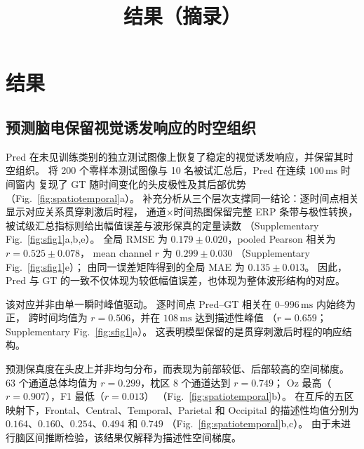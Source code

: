 \documentclass[a4paper,11pt]{article}
\title{结果（摘录）}
\author{}
\date{}
\begin{document}
\maketitle


\setcounter{section}{2}
\section{结果}
\label{sec:results}

\subsection{预测脑电保留视觉诱发响应的时空组织}
\label{sec:spatiotemporal}

Pred 在未见训练类别的独立测试图像上恢复了稳定的视觉诱发响应，并保留其时空组织。
将 200 个零样本测试图像与 10 名被试汇总后，Pred 在连续 $100\,\mathrm{ms}$ 时间窗内
复现了 GT 随时间变化的头皮极性及其后部优势
（Fig.~\ref{fig:spatiotemporal}a）。
补充分析从三个层次支撑同一结论：逐时间点相关显示对应关系贯穿刺激后时程，
通道$\times$时间热图保留完整 ERP 条带与极性转换，
被试级汇总指标则给出幅值误差与波形保真的定量读数
（Supplementary Fig.~\ref{fig:sfig1}a,b,e）。
全局 RMSE 为 $0.179\pm0.020$，pooled Pearson 相关为 $r=0.525\pm0.078$，
mean channel $r$ 为 $0.299\pm0.030$
（Supplementary Fig.~\ref{fig:sfig1}e）；
由同一误差矩阵得到的全局 MAE 为 $0.135\pm0.013$。
因此，Pred 与 GT 的一致不仅体现为较低幅值误差，也体现为整体波形结构的对应。

该对应并非由单一瞬时峰值驱动。
逐时间点 Pred--GT 相关在 $0$--$996\,\mathrm{ms}$ 内始终为正，
跨时间均值为 $r=0.506$，并在 $108\,\mathrm{ms}$ 达到描述性峰值
（$r=0.659$；Supplementary Fig.~\ref{fig:sfig1}a）。
这表明模型保留的是贯穿刺激后时程的响应结构。

预测保真度在头皮上并非均匀分布，而表现为前部较低、后部较高的空间梯度。
63 个通道总体均值为 $r=0.299$，枕区 8 个通道达到 $r=0.749$；
Oz 最高（$r=0.907$），F1 最低（$r=0.013$）
（Fig.~\ref{fig:spatiotemporal}b）。
在互斥的五区映射下，Frontal、Central、Temporal、Parietal 和 Occipital
的描述性均值分别为 $0.164$、$0.160$、$0.254$、$0.494$ 和 $0.749$
（Fig.~\ref{fig:spatiotemporal}b,c）。
由于未进行脑区间推断检验，该结果仅解释为描述性空间梯度。
\end{document}
